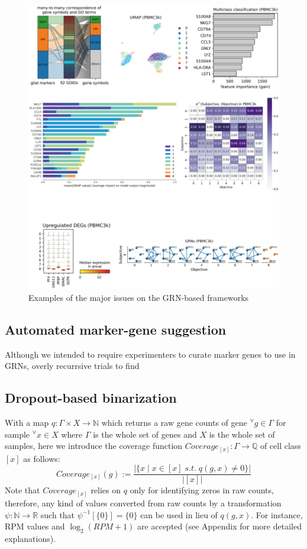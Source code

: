 \documentclass{article}
\begin{document}
\begin{figure}[htb]
  \centering
  \includegraphics[scale=0.8]{./figs/exported/figure_2.png}
  \caption{Examples of the major issues on the GRN-based frameworks}
  \label{bc}
\end{figure}


\subsection*{Automated marker-gene suggestion}
Although we intended to require experimenters to curate marker genes to use
in GRNs, overly recurrsive trials to find 

\subsection*{Dropout-based binarization}
With a map $q: \Gamma\times X\rightarrow \mathbb{N}$ which returns a raw gene counts
of gene $^\forall g\in\Gamma$ for sample $^\forall x\in X$ where $\Gamma$ is the whole set of genes 
and $X$ is the whole set of samples, here we introduce the coverage function $Coverage_{[x]}: \Gamma\rightarrow\mathbb{Q}$ 
of cell class $[x]$ as follows:
\begin{equation}\label{coverage}
  Coverage_{[x]}(g):=\frac{
    |\{x\;|\;x\in[x]\;s.t.\;q(g,x)\neq 0\}|
  }{
    |[x]|
  }
\end{equation}
Note that $Coverage_{[x]}$ relies on $q$ only for identifying zeros in raw counts, therefore, 
any kind of values converted from raw counts by a transformation $\psi: \mathbb{N}\rightarrow\mathbb{R}$ 
such that $\psi^{-1}[\{0\}]=\{0\}$ can be used in lieu of $q(g, x)$. For instance, \ac{RPM} values 
and $\log_2(RPM+1)$ are accepted (see Appendix for more detailed explanations).
\end{document}
